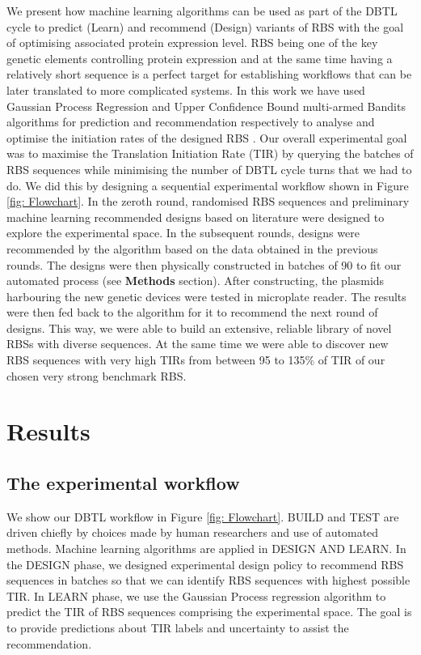 \documentclass{article}
\begin{document}
We present how machine learning algorithms can be used as part of the DBTL cycle to predict (Learn) and recommend (Design) variants of RBS with the goal of optimising associated protein expression level. 
RBS being one of the key genetic elements controlling protein expression and at the same time having a relatively short sequence is a perfect target for establishing workflows that can be later translated to more complicated systems.
In this work we have used Gaussian Process Regression \cite{Rasmussen2004} and Upper Confidence Bound multi-armed Bandits algorithms \cite{desautels2012parallelizing} for prediction and recommendation respectively to analyse and optimise the initiation rates of the designed RBS .
Our overall experimental goal was to maximise the Translation Initiation Rate (TIR) by querying the batches of RBS sequences while minimising the number of DBTL cycle turns that we had to do.
We did this by designing a sequential experimental workflow shown in Figure \ref{fig: Flowchart}.
In the zeroth round, randomised RBS sequences and preliminary machine learning recommended designs based on literature were designed to explore the experimental space. 
In the subsequent rounds, designs were recommended by the algorithm based on the data obtained in the previous rounds. 
The designs were then physically constructed in batches of 90 to fit our automated process (see \textbf{Methods} section).
After constructing, the plasmids harbouring the new genetic devices were tested in microplate reader.
The results were then fed back to the algorithm for it to recommend the next round of designs.
This way, we were able to build an extensive, reliable library of novel RBSs with diverse sequences.
At the same time we were able to discover new RBS sequences with very high TIRs from between 95 to 135\% of TIR of our chosen very strong benchmark RBS. 

\section{Results}

\subsection{The experimental workflow}

We show our DBTL workflow in Figure \ref{fig: Flowchart}.
BUILD and TEST are driven chiefly by choices made by human researchers and use of automated methods.
Machine learning algorithms are applied in DESIGN AND LEARN.
In the DESIGN phase, we designed experimental design policy to recommend RBS sequences in batches so that we can identify RBS sequences with highest possible TIR. 
In LEARN phase, we use the Gaussian Process regression algorithm to predict the TIR of RBS sequences comprising the experimental space.
The goal is to provide predictions about TIR labels and uncertainty to assist the recommendation.\\
\end{document}
